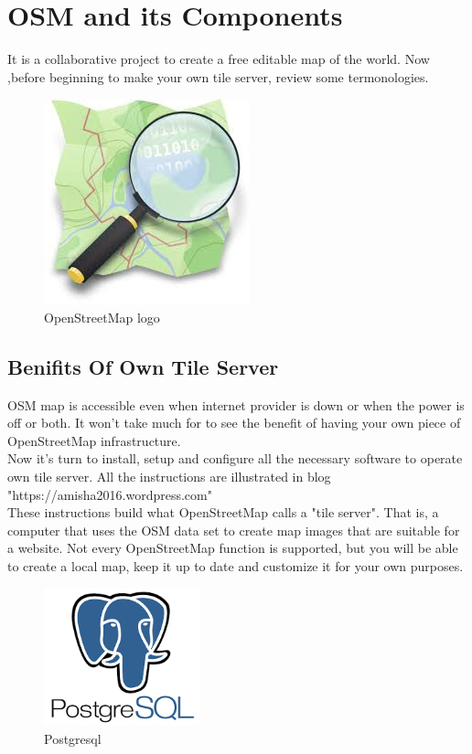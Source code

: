 \section{OSM and its Components }
It is a collaborative project to create a free editable map of the world.
Now ,before beginning to make your own tile server, review some termonologies.
\begin{figure}[ht]
\centering \includegraphics[scale=0.6]{input/images/index.jpeg}
\caption{OpenStreetMap logo}
\end{figure}

\subsection{Benifits Of Own Tile Server}
 OSM map is accessible even when internet provider is down or when the power is off or both. It won't take much for to see the benefit of having your own piece of OpenStreetMap infrastructure.\\
Now it's turn to install, setup and configure all the necessary software to operate own tile server. All the instructions are illustrated in blog "https://amisha2016.wordpress.com"\\
These instructions build what OpenStreetMap calls a "tile server". That is, a computer that uses the OSM data set to create map images that are suitable for a website. Not every OpenStreetMap function is supported, but you will be able to create a local map, keep it up to date and customize it for your own purposes.
\begin{figure}[!ht]
\centering
\includegraphics[width=0.4\textwidth]{input/images/index.png}                   
\caption{Postgresql}
\hspace{-1.5em}
\end{figure}



